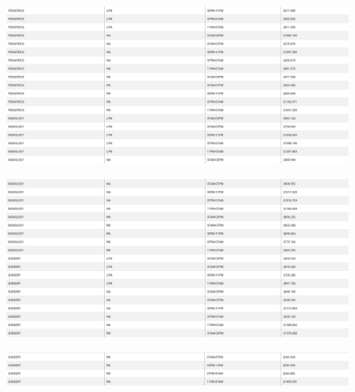 \documentclass[11pt]{article}
\makeatletter
\def\maxwidth{\ifdim\Gin@nat@width>\linewidth\linewidth
    \else\Gin@nat@width\fi}
\let\Oldincludegraphics\includegraphics
\renewcommand{\includegraphics}[1]{\Oldincludegraphics[width=.8\maxwidth]{#1}}
\makeatother
\begin{document}
  \begin{figure}[H]
	\centering
	\includegraphics{11.png}
	\caption{}
\end{figure}

  \begin{figure}[H]
	\centering
	\includegraphics{12.png}
	\caption{}
\end{figure}

  \begin{figure}[H]
 	\centering
 	\includegraphics{13.png}
 	\caption{}
 \end{figure}
 

    
    
   
    
\end{document}
